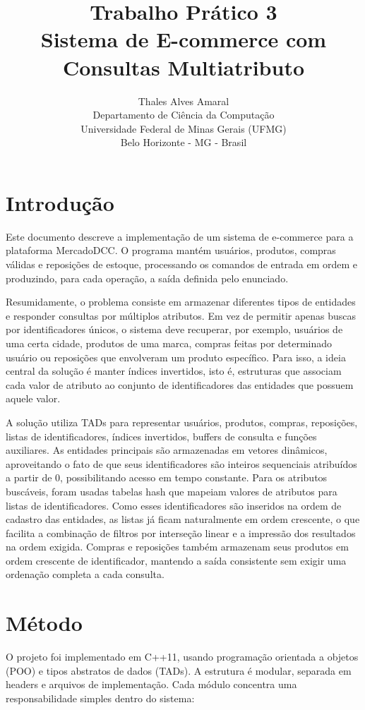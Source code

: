 \documentclass[11pt,a4paper]{article}
\title{Trabalho Prático 3 \\ Sistema de E-commerce com Consultas Multiatributo}
\author{Thales Alves Amaral \\ \small{Departamento de Ciência da Computação} \\ \small{Universidade Federal de Minas Gerais (UFMG)} \\ \small{Belo Horizonte - MG - Brasil}}
\date{}
\begin{document}
\maketitle

\section{Introdução}
Este documento descreve a implementação de um sistema de e-commerce para a plataforma MercadoDCC. O programa mantém usuários, produtos, compras válidas e reposições de estoque, processando os comandos de entrada em ordem e produzindo, para cada operação, a saída definida pelo enunciado.

Resumidamente, o problema consiste em armazenar diferentes tipos de entidades e responder consultas por múltiplos atributos. Em vez de permitir apenas buscas por identificadores únicos, o sistema deve recuperar, por exemplo, usuários de uma certa cidade, produtos de uma marca, compras feitas por determinado usuário ou reposições que envolveram um produto específico. Para isso, a ideia central da solução é manter índices invertidos, isto é, estruturas que associam cada valor de atributo ao conjunto de identificadores das entidades que possuem aquele valor.

A solução utiliza TADs para representar usuários, produtos, compras, reposições, listas de identificadores, índices invertidos, buffers de consulta e funções auxiliares. As entidades principais são armazenadas em vetores dinâmicos, aproveitando o fato de que seus identificadores são inteiros sequenciais atribuídos a partir de 0, possibilitando acesso em tempo constante. Para os atributos buscáveis, foram usadas tabelas hash que mapeiam valores de atributos para listas de identificadores. Como esses identificadores são inseridos na ordem de cadastro das entidades, as listas já ficam naturalmente em ordem crescente, o que facilita a combinação de filtros por interseção linear e a impressão dos resultados na ordem exigida. Compras e reposições também armazenam seus produtos em ordem crescente de identificador, mantendo a saída consistente sem exigir uma ordenação completa a cada consulta.

\section{Método}
O projeto foi implementado em C++11, usando programação orientada a objetos (POO) e tipos abstratos de dados (TADs). A estrutura é modular, separada em headers e arquivos de implementação. Cada módulo concentra uma responsabilidade simples dentro do sistema:
\end{document}
